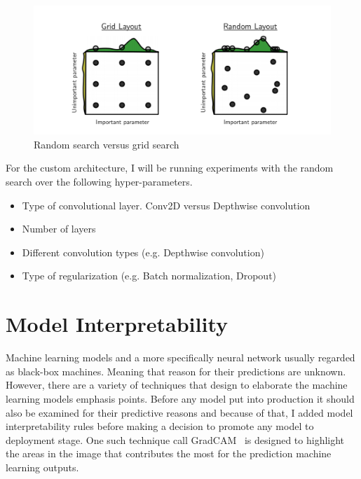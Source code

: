 \begin{figure}[H]
    \centering
    \includegraphics[width=\textwidth]{img/randomsearch.png}
    \caption{Random search versus grid search~\cite{randomsearch}}
    \label{fig:randomsearch}
\end{figure}

For the custom architecture, I will be running experiments with the random search over the following hyper-parameters.

\begin{itemize}
    \item Type of convolutional layer. Conv2D versus Depthwise convolution
    \item Number of layers
    \item Different convolution types (e.g. Depthwise convolution)
    \item Type of regularization (e.g. Batch normalization, Dropout)
\end{itemize}

\section{Model Interpretability}
Machine learning models and a more specifically neural network usually regarded as black-box machines.
Meaning that reason for their predictions are unknown.
However, there are a variety of techniques that design to elaborate the machine learning models emphasis points.
Before any model put into production it should also be examined for their predictive reasons and because of that, I added model interpretability rules before making a decision to promote any model to deployment stage.
One such technique call GradCAM~\cite{heatmap} is designed to highlight the areas in the image that contributes the most for the prediction machine learning outputs.

